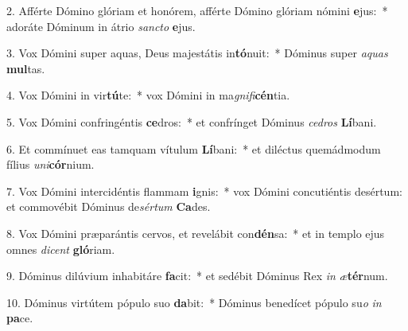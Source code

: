 2. Afférte Dómino glóriam et honórem, afférte Dómino glóriam nómini \textbf{e}jus:~*  adoráte Dóminum in átrio \textit{sanc}\textit{to} \textbf{e}jus.\

3. Vox Dómini super aquas, Deus majestátis in\textbf{tó}nuit:~*  Dóminus super \textit{a}\textit{quas} \textbf{mul}tas.\

4. Vox Dómini in vir\textbf{tú}te:~*  vox Dómini in ma\textit{gni}\textit{fi}\textbf{cén}tia.\

5. Vox Dómini confringéntis \textbf{ce}dros:~*  et confrínget Dóminus \textit{ce}\textit{dros} \textbf{Lí}bani.\

6. Et commínuet eas tamquam vítulum \textbf{Lí}bani:~*  et diléctus quemádmodum fílius \textit{u}\textit{ni}\textbf{cór}nium.\

7. Vox Dómini intercidéntis flammam \textbf{i}gnis:~*  vox Dómini concutiéntis desértum: et commovébit Dóminus de\textit{sér}\textit{tum} \textbf{Ca}des.\

8. Vox Dómini præparántis cervos, et revelábit con\textbf{dén}sa:~*  et in templo ejus omnes \textit{di}\textit{cent} \textbf{gló}riam.\

9. Dóminus dilúvium inhabitáre \textbf{fa}cit:~*  et sedébit Dóminus Rex \textit{in} \textit{æ}\textbf{tér}num.\

10. Dóminus virtútem pópulo suo \textbf{da}bit:~*  Dóminus benedícet pópulo su\textit{o} \textit{in} \textbf{pa}ce.\

